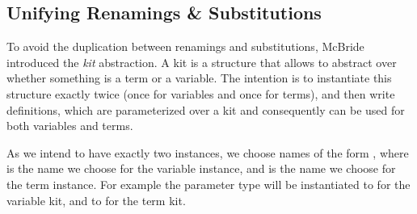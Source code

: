 \documentclass[a4paper, UKenglish, cleveref, autoref, thm-restate]{lipics-v2021}
\newenvironment{LibCode*}{%
  \begin{tcolorbox}[%
    colframe=white,%
    boxrule=0.0pt,%
    top=2.5pt,%
    left=2.5pt,%
    bottom=2.5pt,%
    right=2.5pt,%
    before skip=5pt,%
    after skip=5pt,%
    boxsep=0pt%
  ]
}{%
  \end{tcolorbox}%
}
\newcommand*\LibCode[1]{\begin{LibCode*}{#1}\end{LibCode*}}
\newcommand*\ACode[1]{\AgdaFontStyle{\textcolor{mygray}{#1}}}
\newcommand*\AField[1]{\AgdaField{#1}}
\newcommand*\ACon[1]{\AgdaInductiveConstructor{#1}}
\begin{document}
  \subsection{Unifying Renamings \& Substitutions}
  \label{sec:maps:kits}
  To avoid the duplication between renamings and substitutions,
  McBride\cite{DBLP:journals/jar/BentonHKM12, unpublished:mcbride2005kits}
  introduced the \emph{kit} abstraction.
  A kit is a structure that allows to abstract over whether
  something is a term or a variable. The intention is to instantiate
  this structure exactly twice (once for variables and once for terms),
  and then write definitions, which are parameterized over a kit and
  consequently can be used for both variables and terms.
  \LibCode\KKit

  As we intend to have exactly two \ACode{\ACon{Kit}} instances, we choose names of
  the form \ACode{x/y}, where \ACode{x} is the name we choose for the
  variable instance, and \ACode{y} is the name we choose for the term
  instance.
  For example the parameter type \ACode{\_∋/⊢\_} will be instantiated
  to \ACode{\ACon{\_∋\_}} for the variable kit, and to \ACode{\AField{\_⊢\_}} for the
  term kit.
\end{document}
